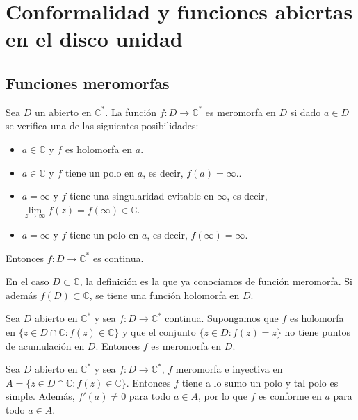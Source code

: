 \chapter{Conformalidad y funciones abiertas en el disco unidad}

\section{Funciones meromorfas}
\begin{definition}
    Sea $D$ un abierto en $\mathbb{C}^\ast$.
    La función $f: D \to \mathbb{C}^\ast$ es meromorfa en $D$ si dado $a \in D$ se verifica una de las siguientes posibilidades:
    \begin{itemize}
        \item $a \in \mathbb{C}$ y $f$ es holomorfa en $a$.
        \item $a \in \mathbb{C}$ y $f$ tiene un polo en $a$, es decir, $f(a) = \infty$..
        \item $a = \infty$ y $f$ tiene una singularidad evitable en $\infty$, es decir, $\lim\limits_{z \to \infty} f(z) = f(\infty) \in \mathbb{C}$.
        \item $a = \infty$ y $f$ tiene un polo en $a$, es decir, $f(\infty) = \infty$.
    \end{itemize}

    Entonces $f: D \to \mathbb{C}^\ast$ es continua.
\end{definition}

\begin{remark}
    En el caso $D \subset \mathbb{C}$, la definición es la que ya conocíamos de función meromorfa.
    Si además $f(D) \subset \mathbb{C}$, se tiene una función holomorfa en $D$.
\end{remark}

\begin{remark}
    Sea $D$ abierto en $\mathbb{C}^\ast$ y sea $f: D \to \mathbb{C}^\ast$ continua.
    Supongamos que $f$ es holomorfa en $\{z \in D \cap \mathbb{C} : f(z) \in \mathbb{C}\}$ y que el conjunto $\{z \in D : f(z) = z\}$ no tiene puntos de acumulación en $D$.
    Entonces $f$ es meromorfa en $D$.
\end{remark}

\begin{remark}
    Sea $D$ abierto en $\mathbb{C}^\ast$ y sea $f: D \to \mathbb{C}^\ast$, $f$ meromorfa e inyectiva en $ A = \{z \in D \cap \mathbb{C} : f(z) \in \mathbb{C}\}$.
    Entonces $f$ tiene a lo sumo un polo y tal polo es simple.
    Además, $f'(a) \neq 0$ para todo $a \in A$, por lo que $f$ es conforme en $a$ para todo $a \in A$.
\end{remark}

